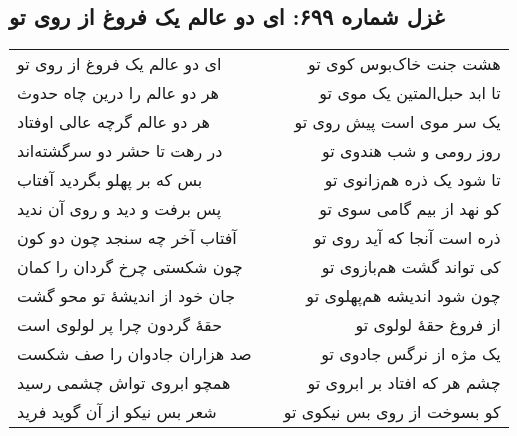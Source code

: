 \begin{center}
\section*{غزل شماره ۶۹۹: ای دو عالم یک فروغ از روی تو}
\label{sec:699}
\begin{longtable}{l p{0.5cm} r}
ای دو عالم یک فروغ از روی تو
&&
هشت جنت خاک‌بوس کوی تو
\\
هر دو عالم را درین چاه حدوث
&&
تا ابد حبل‌المتین یک موی تو
\\
هر دو عالم گرچه عالی اوفتاد
&&
یک سر موی است پیش روی تو
\\
در رهت تا حشر دو سرگشته‌اند
&&
روز رومی و شب هندوی تو
\\
بس که بر پهلو بگردید آفتاب
&&
تا شود یک ذره هم‌زانوی تو
\\
پس برفت و دید و روی آن ندید
&&
کو نهد از بیم گامی سوی تو
\\
آفتاب آخر چه سنجد چون دو کون
&&
ذره است آنجا که آید روی تو
\\
چون شکستی چرخ گردان را کمان
&&
کی تواند گشت هم‌بازوی تو
\\
جان خود از اندیشهٔ تو محو گشت
&&
چون شود اندیشه هم‌پهلوی تو
\\
حقهٔ گردون چرا پر لولوی است
&&
از فروغ حقهٔ لولوی تو
\\
صد هزاران جادوان را صف شکست
&&
یک مژه از نرگس جادوی تو
\\
همچو ابروی تواش چشمی رسید
&&
چشم هر که افتاد بر ابروی تو
\\
شعر بس نیکو از آن گوید فرید
&&
کو بسوخت از روی بس نیکوی تو
\\
\end{longtable}
\end{center}
